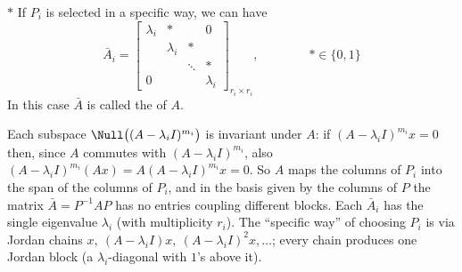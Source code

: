 $\ast$ If $P_i$ is selected in a specific way, we can have
\[
\bar A_i=\begin{bmatrix}\lambda_i & \ast & & 0\\ & \lambda_i & \ast & \\ & & \ddots & \ast\\ 0 & & & \lambda_i\end{bmatrix}_{r_i\times r_i},
\qquad\qquad \ast\in\{0,1\}
\]
In this case $\bar A$ is called the  of $A$.
\begin{insight}
Each subspace $\Null\big((A-\lambda_iI)^{m_i}\big)$ is invariant under $A$: if $(A-\lambda_iI)^{m_i}x=0$ then, since $A$ commutes with $(A-\lambda_iI)^{m_i}$, also $(A-\lambda_iI)^{m_i}(Ax)=A(A-\lambda_iI)^{m_i}x=0$. So $A$ maps the columns of $P_i$ into the span of the columns of $P_i$, and in the basis given by the columns of $P$ the matrix $\bar A=P^{-1}AP$ has no entries coupling different blocks. Each $\bar A_i$ has the single eigenvalue $\lambda_i$ (with multiplicity $r_i$). The ``specific way'' of choosing $P_i$ is via Jordan chains $x,\ (A-\lambda_iI)x,\ (A-\lambda_iI)^2x,\dots$; every chain produces one Jordan block (a $\lambda_i$-diagonal with $1$'s above it).
\end{insight}

